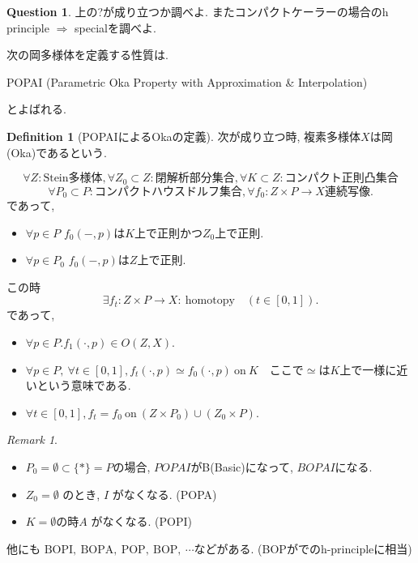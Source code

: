 \documentclass[dvipdfmx,a4paper,11pt]{article} %
\theoremstyle{definition}
\newtheorem{defn}[thm]{Definition}
\newtheorem{ques}[thm]{Question}
\theoremstyle{remark}
\newtheorem{rem}[thm]{Remark}
\numberwithin{equation}{section}
\begin{document}
\begin{ques}
上の?が成り立つか調べよ. またコンパクトケーラーの場合のh principle $\Rightarrow$ specialを調べよ.
\end{ques}



次の岡多様体を定義する性質は.
\begin{center}
POPAI (Parametric Oka Property with Approximation \& Interpolation)
\end{center}
とよばれる.

\begin{defn}[POPAIによるOkaの定義]
次が成り立つ時, 複素多様体$X$は岡(Oka)であるという.

\[
\forall Z:\text{Stein多様体}, \forall Z_0\subset Z: \text{閉解析部分集合}, 
\forall K\subset Z:\text{コンパクト正則凸集合}
\]
\[
\forall P_0\subset P:\text{コンパクトハウスドルフ集合}, 
\forall f_0:Z\times P\longrightarrow X \text{連続写像}.
\]
であって, 
\begin{itemize}
\item\(\forall p\in P\) $f_0(-,p)$は$K$上で正則かつ$Z_0$上で正則.
\item \(\forall p\in P_0\) $f_0(-,p)$は$Z$上で正則. 
\end{itemize}
この時
\[
\exists f_t:Z\times P\longrightarrow X:\ \mathrm{homotopy}\quad (t\in[0,1]).
\]
であって, 
\begin{itemize}
\item \(\forall p\in P. f_1(\cdot,p)\in O(Z,X)\). 
\item \(\forall p\in P,\ \forall t\in[0,1],
f_t(\cdot,p) \simeq f_0(\cdot,p)\ \mathrm{on}\ K
\)　ここで$\simeq$は$K$上で一様に近いという意味である. 
\item \(\forall t\in[0,1],
f_t=f_0\ \mathrm{on}\ (Z\times P_0)\cup(Z_0\times P).
\)
\end{itemize}
\end{defn}

\begin{rem}
\begin{itemize}
\item $P_0=\emptyset\subset\{*\}=P$の場合, $POPAI$がB(Basic)になって, $BOPAI$になる.
\item \(Z_0=\emptyset\) のとき, \(I\) がなくなる. (POPA)
\item$K=\emptyset$の時$A$ がなくなる. (POPI) 
\end{itemize}
他にも
\(\mathrm{BOPI},\ \mathrm{BOPA},\ \mathrm{POP},\ \mathrm{BOP},\ \cdots\)などがある. (BOPが\cite{CW15}でのh-principleに相当)
\end{rem}
\end{document}
